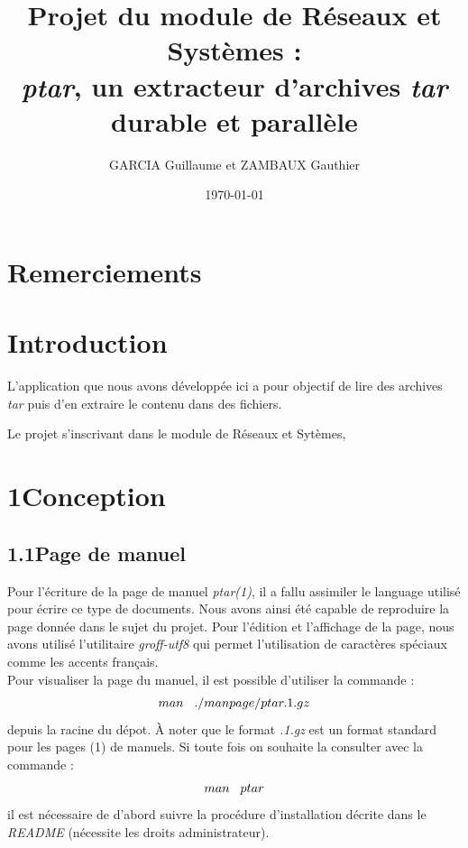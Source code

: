 \documentclass[12pt, a4paper]{report}
\title{Projet du module de Réseaux et Systèmes :\\ \textit{ptar}, un extracteur d'archives \textit{tar} durable et parallèle}
\author{GARCIA  Guillaume et ZAMBAUX Gauthier}
\date{\today}
\begin{document}
\maketitle



\chapter*{Remerciements}


\chapter*{Introduction}
\hspace{1cm}L'application que nous avons développée ici a pour objectif de lire des archives \textit{tar} puis d'en extraire le contenu dans des fichiers.\vspace{0.2cm}

\hspace{0.5cm}Le projet s'inscrivant dans le module de Réseaux et Sytèmes, \vspace{0.2cm}


\chapter*{1\hspace{1cm}Conception}

\section*{\hspace{0.6cm}1.1\hspace{0.6cm}Page de manuel}
\hspace{1cm}Pour l'écriture de la page de manuel \textit{ptar(1)}, il a fallu assimiler le language utilisé pour écrire ce type de documents. Nous avons ainsi été capable de reproduire la page donnée dans le sujet du projet. Pour l'édition et l'affichage de la page, nous avons utilisé l'utilitaire \textit{groff-utf8} qui permet l'utilisation de caractères spéciaux comme les accents français. \\

\hspace{0.5cm}Pour visualiser la page du manuel, il est possible d'utiliser la commande : \[man\hspace{0.3cm}./manpage/ptar.1.gz\]  depuis la racine du dépot. À noter que le format \textit{.1.gz} est un format standard pour les pages (1) de manuels. Si toute fois on souhaite la consulter avec la commande : \[man\hspace{0.3cm}ptar\] il est nécessaire de d'abord suivre la procédure d'installation décrite dans le \textit{README} (nécessite les droits administrateur).
\end{document}
